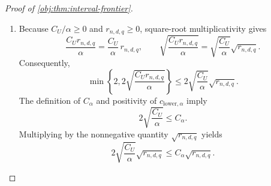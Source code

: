 \documentclass[11pt]{article}
\begin{document}
\begin{proof}[Proof of \cref{obj:thm:interval-frontier}]
\begin{enumerate}
The law class is nonempty. Indeed, the paired construction with all latent masses zero concentrates on its filler label. Write \(P_{\mathrm{fill}}\) for this law, specified by
\[
\begin{gathered}
X=0,\qquad S(0)=S(1)=Y(0)=0,\qquad R=1,\\
A\sim\operatorname{Bernoulli}(1/2),\qquad
Y(1)\sim\operatorname{Bernoulli}\!\left(\frac{(1+q)^2}{8q}\right),
\qquad A\perp Y(1),\\
S=S(A),\qquad Y=Y(A),\qquad RY=R\,Y.
\end{gathered}
\]
The Bernoulli parameter belongs to \([0,1]\), since
\[
0<(1+q)^2\le4\le8q.
\]
This law has one occupied baseline label, independent balanced treatment, consistent realized measurements, and complete arrival. Hence, by \cref{obj:def:law-class},
\[
P_{\mathrm{fill}}\in\mathcal M(d,q).
\]
Taking the supremum of the expected-length bound gives
\[
\sup_{P\in\mathcal M(d,q)}
\mathbb E_{P_O^{\otimes n}}
\left[
\operatorname{length}\{\widehat I_{\mathrm{MM},\alpha}(O^n)\}
\right]
\le
\min\left\{2,2\sqrt{\frac{C_Ur_{n,d,q}}{\alpha}}\right\}.
\]

\item Because \(C_U/\alpha\ge0\) and \(r_{n,d,q}\ge0\), square-root multiplicativity gives
\[
\frac{C_Ur_{n,d,q}}{\alpha}
=\frac{C_U}{\alpha}\,r_{n,d,q},
\qquad
\sqrt{\frac{C_Ur_{n,d,q}}{\alpha}}
=\sqrt{\frac{C_U}{\alpha}}\sqrt{r_{n,d,q}}.
\]
Consequently,
\[
\min\left\{2,2\sqrt{\frac{C_Ur_{n,d,q}}{\alpha}}\right\}
\le
2\sqrt{\frac{C_U}{\alpha}}\sqrt{r_{n,d,q}}.
\]
The definition of \(C_\alpha\) and positivity of \(c_{\mathrm{lower},\alpha}\) imply
\[
2\sqrt{\frac{C_U}{\alpha}}\le C_\alpha.
\]
Multiplying by the nonnegative quantity \(\sqrt{r_{n,d,q}}\) yields
\[
2\sqrt{\frac{C_U}{\alpha}}\sqrt{r_{n,d,q}}
\le C_\alpha\sqrt{r_{n,d,q}}.
\]


\end{enumerate}
\end{proof}
\end{document}
